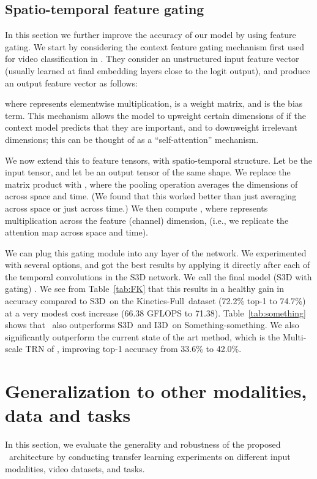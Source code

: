 \documentclass[runningheads]{llncs}
\newcommand{\Sthree}{S3D} \newcommand{\Ithree}{I3D}
\newcommand{\Something}{Something-something}
\newcommand{\FK}{Kinetics-Full}
\begin{document}
 \subsection{Spatio-temporal feature gating}
\label{sec:gating}

In this section we further improve the accuracy of our model by using feature gating.
We start by considering the context feature gating
mechanism first used for video classification in \cite{miech2017learnable}. 
They consider an unstructured input feature vector  (usually learned at final embedding layers close to the logit output), 
and produce an output feature vector  as follows:

where  represents elementwise multiplication,
 is a weight matrix,
and  is the bias term.
This mechanism allows the model to upweight certain 
dimensions of  if the context model  predicts that they are important,
and to downweight irrelevant dimensions; this can be thought of as a ``self-attention'' mechanism.

We now extend this to feature tensors, with spatio-temporal structure.
Let  be the input tensor,
and let  be an output tensor of the same shape.
We replace the matrix product  with ,
where the pooling operation averages the dimensions of  across space and time.
(We found that this worked better than  just averaging across space or just across time.)
We then compute ,
where  represents multiplication across the feature (channel) dimension,
(i.e., we replicate the attention map  across space and time).

We can plug this gating module into any layer of the network.
We experimented with several options, and got the best results by applying it directly after
each of the  temporal convolutions in the S3D network.
We call the final model (S3D with gating) \SG.
We see from Table~\ref{tab:FK} that this results in a healthy gain in accuracy 
compared to \Sthree\
on the \FK\ dataset (72.2\% top-1 to 74.7\%) at a very modest cost increase (66.38 GFLOPS to 71.38). Table~\ref{tab:something} shows that \SG\ also outperforms \Sthree\ and \Ithree\
on \Something.
We also significantly outperform the current state of the art method,
which is the Multi-scale TRN of \cite{zhou_trn},
improving top-1 accuracy from 33.6\% to 42.0\%.  \section{Generalization to other modalities, data and tasks}

In this section,  we evaluate the generality and robustness of the proposed \SG\ architecture by conducting transfer learning experiments on different input modalities, video datasets, and tasks. 
\end{document}
